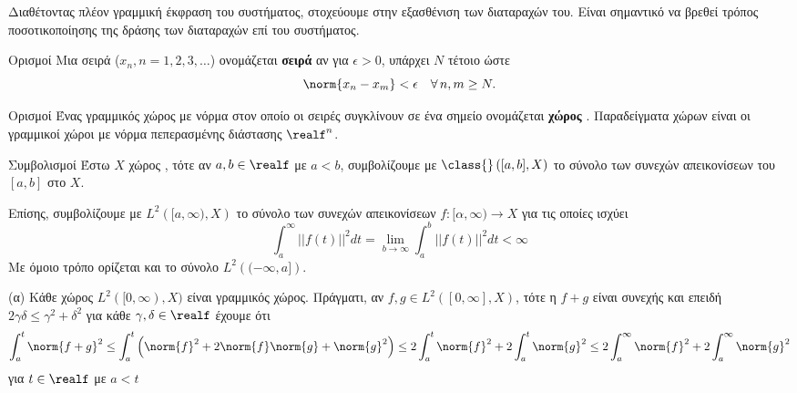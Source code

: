 Διαθέτοντας πλέον γραμμική έκφραση του συστήματος, στοχεύουμε στην εξασθένιση 
των διαταραχών του. Είναι σημαντικό να βρεθεί τρόπος ποσοτικοποίησης της δράσης
των διαταραχών επί του συστήματος.  

\begin{nameddefn}{Ορισμοί}
    Μια σειρά ($x_n,n = 1,2,3,\ldots$) ονομάζεται \textbf{σειρά } αν 
    για $\epsilon > 0$, υπάρχει $N$ τέτοιο ώστε 
    \begin{equation*}
        \norm{x_n - x_m} < \epsilon\quad \forall \, n,m \geq N.
    \end{equation*}
\end{nameddefn}
\begin{nameddefn}{Ορισμοί}
    Ένας γραμμικός χώρος με νόρμα στον οποίο οι σειρές  συγκλίνουν 
    σε ένα σημείο ονομάζεται \textbf{χώρος }. Παραδείγματα χώρων 
     είναι οι γραμμικοί χώροι με νόρμα πεπερασμένης διάστασης 
     $\realf^n$.
\end{nameddefn}

\begin{nameddefn}{Συμβολισμοί}
    Έστω $X$ χώρος , τότε αν $a, b \in \realf$ με $a <b$, 
    συμβολίζουμε με $\class{} \left([a,b],X\right)$ το σύνολο των συνεχών απεικονίσεων
    του $[a, b]$ στο $X$.
    
    Επίσης, συμβολίζουμε με $L^2\left([a, \infty),X\right)$ το σύνολο των 
    συνεχών απεικονίσεων $f:[\alpha,\infty)\rightarrow X$ για τις οποίες ισχύει
\begin{equation*}
    \int_{a}^{\infty} ||f(t)||^2 dt = \lim_{b\rightarrow \infty}\int_{a}^{b} 
    ||f(t)||^2 dt < \infty
\end{equation*}
Με όμοιο τρόπο ορίζεται και το σύνολο $L^2\left((-\infty,a]\right)$.
\end{nameddefn}

(α) Κάθε χώρος $L^2([0, \infty), X)$ είναι γραμμικός χώρος. Πράγματι, αν $f, g \in 
L^2([0, \infty], X)$, τότε η $f + g$ είναι συνεχής και επειδή $2\gamma\delta \leq
\gamma^2 + \delta^2$ για κάθε $\gamma, \delta \in \realf$ έχουμε ότι
\begin{equation*}
    \int_{a}^{t} \norm{f + g}^2 \leq \int_{a}^{t} \left( \norm{f}^2 + 2\norm{f}
    \norm{g} + \norm{g}^2 \right) \leq 2 \int_{a}^{t} \norm{f}^2 + 2 
    \int_{a}^{t} \norm{g}^2 \leq 2 \int_{a}^{\infty} \norm{f}^2 + 2 
    \int_{a}^{\infty} \norm{g}^2
\end{equation*}
για $t\in\realf$ με $a < t$

